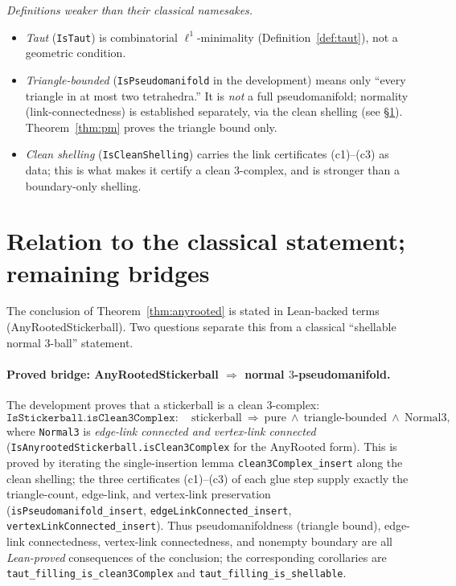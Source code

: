 \documentclass[11pt]{article}
\theoremstyle{plain}
\theoremstyle{definition}
\theoremstyle{remark}
\newcommand{\code}[1]{\texttt{#1}}
\begin{document}
\noindent\emph{Definitions weaker than their classical namesakes.}
\begin{itemize}
\item \emph{Taut} (\code{IsTaut}) is combinatorial $\ell^1$-minimality
(Definition~\ref{def:taut}), not a geometric condition.
\item \emph{Triangle-bounded} (\code{IsPseudomanifold} in the development) means only ``every
triangle in at most two tetrahedra.'' It is \emph{not} a full pseudomanifold; normality
(link-connectedness) is established separately, via the clean shelling (see
\S\ref{sec:classical}). Theorem~\ref{thm:pm} proves the triangle bound only.
\item \emph{Clean shelling} (\code{IsCleanShelling}) carries the link certificates
(c1)--(c3) as data; this is what makes it certify a clean $3$-complex, and is stronger than a
boundary-only shelling.
\end{itemize}

\section{Relation to the classical statement; remaining bridges}\label{sec:classical}

The conclusion of Theorem~\ref{thm:anyrooted} is stated in Lean-backed terms
(AnyRootedStickerball). Two questions separate this from a classical ``shellable normal
$3$-ball'' statement.

\paragraph{Proved bridge: AnyRootedStickerball $\Rightarrow$ normal $3$-pseudomanifold.}
The development proves that a stickerball is a clean $3$-complex:
\[
\code{IsStickerball.isClean3Complex}\colon\quad
\text{stickerball}\ \Longrightarrow\ \text{pure}\ \wedge\ \text{triangle-bounded}\ \wedge\
\text{Normal3},
\]
where \code{Normal3} is \emph{edge-link connected and vertex-link connected}
(\code{IsAnyrootedStickerball.isClean3Complex} for the AnyRooted form). This is proved by
iterating the single-insertion lemma \code{clean3Complex\_insert} along the clean shelling;
the three certificates (c1)--(c3) of each glue step supply exactly the triangle-count,
edge-link, and vertex-link preservation (\code{isPseudomanifold\_insert},
\code{edgeLinkConnected\_insert}, \code{vertexLinkConnected\_insert}). Thus pseudomanifoldness
(triangle bound), edge-link connectedness, vertex-link connectedness, and nonempty boundary
are all \emph{Lean-proved} consequences of the conclusion; the corresponding corollaries are
\code{taut\_filling\_is\_clean3Complex} and \code{taut\_filling\_is\_shellable}.
\end{document}
